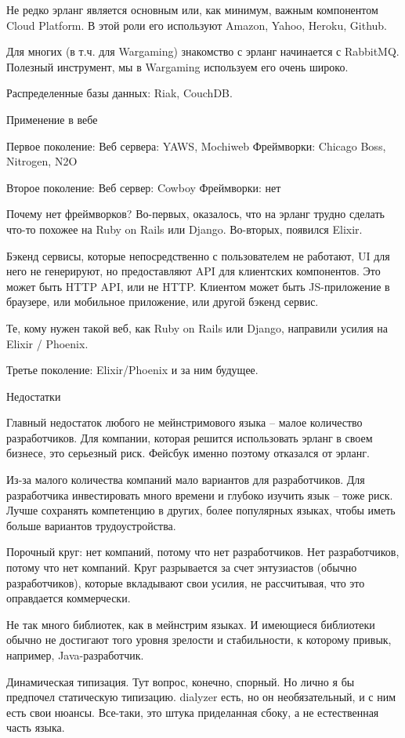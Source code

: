 \documentclass[10pt]{beamer}
\begin{document}
Не редко эрланг является основным или, как минимум, важным компонентом Cloud Platform.
В этой роли его используют Amazon, Yahoo, Heroku, Github.

Для многих (в т.ч. для Wargaming) знакомство с эрланг начинается с RabbitMQ.
Полезный инструмент, мы в Wargaming используем его очень широко.

Распределенные базы данных: Riak, CouchDB.


Применение в вебе

Первое поколение:
Веб сервера: YAWS, Mochiweb
Фреймворки: Chicago Boss, Nitrogen, N2O

Второе поколение:
Веб сервер: Cowboy
Фреймворки: нет

Почему нет фреймворков? Во-первых, оказалось, что на эрланг трудно сделать что-то похожее на Ruby on Rails или Django.
Во-вторых, появился Elixir.

Бэкенд сервисы, которые непосредственно с пользователем не работают, UI для него не генерируют,
но предоставляют API для клиентских компонентов. Это может быть HTTP API, или не HTTP.
Клиентом может быть JS-приложение в браузере, или мобильное приложение, или другой бэкенд сервис.

Те, кому нужен такой веб, как Ruby on Rails или Django, направили усилия на Elixir / Phoenix.

Третье поколение:
Elixir/Phoenix
и за ним будущее.


Недостатки

Главный недостаток любого не мейнстримового языка -- малое количество разработчиков.
Для компании, которая решится использовать эрланг в своем бизнесе, это серьезный риск.
Фейсбук именно поэтому отказался от эрланг.

Из-за малого количества компаний мало вариантов для разработчиков.
Для разработчика инвестировать много времени и глубоко изучить язык -- тоже риск.
Лучше сохранять компетенцию в других, более популярных языках, чтобы иметь больше вариантов трудоустройства.

Порочный круг: нет компаний, потому что нет разработчиков. Нет разработчиков, потому что нет компаний.
Круг разрывается за счет энтузиастов (обычно разработчиков), которые вкладывают свои усилия,
не рассчитывая, что это оправдается коммерчески.

Не так много библиотек, как в мейнстрим языках. И имеющиеся библиотеки обычно не достигают того уровня зрелости и стабильности,
к которому привык, например, Java-разработчик.

Динамическая типизация. Тут вопрос, конечно, спорный. Но лично я бы предпочел статическую типизацию.
dialyzer есть, но он необязательный, и с ним есть свои нюансы. Все-таки, это штука приделанная сбоку,
а не естественная часть языка.
\end{document}
